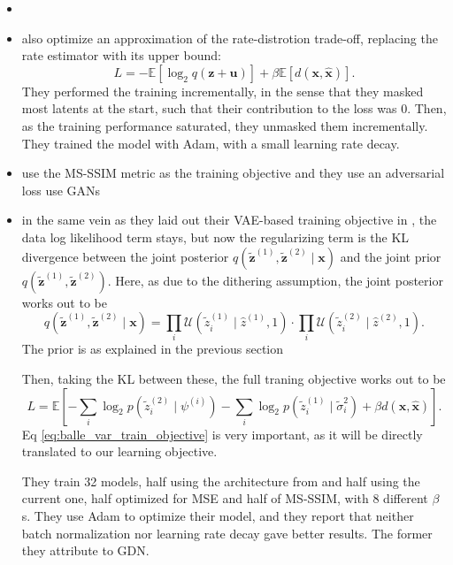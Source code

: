 \documentclass{article}
\renewcommand{\vec}[1]{\mathbf{#1}}
\newcommand{\Exp}{\mathbb{E}}
\newcommand{\Unif}{\mathcal{U}}
\begin{document}
\begin{itemize}
\item \cite{toderici2017full}
\item \cite{theis2017lossy}
  also optimize an approximation of the rate-distrotion trade-off, replacing the
  rate estimator with its upper bound:
  \[
    L = -\Exp[\log_2 q(\vec{z} + \vec{u})] + \beta \Exp[d(\vec{x}, \vec{\hat{x}})].
  \]
  They performed the training incrementally, in the sense that they masked most
  latents at the start, such that their contribution to the loss was 0. Then, as
  the training performance saturated, they unmasked them incrementally.
  They trained the model with Adam, with a small learning rate decay.
\item \cite{rippel2017real} use the MS-SSIM metric as the training objective and
  they use an adversarial \cite{goodfellow2014generative} loss use GANs 
\item \cite{balle2018variational} in the same vein as they laid out their
  VAE-based training objective in \cite{balle2016end}, the data log likelihood
  term stays, but now the regularizing term is the KL divergence between the
  joint posterior $q(\vec{\tilde{z}}^{(1)}, \vec{\tilde{z}}^{(2)} \mid \vec{x})$
  and the joint prior 
  $q(\vec{\tilde{z}}^{(1)}, \vec{\tilde{z}}^{(2)})$. Here, as due to the
  dithering assumption, the joint posterior works out to be
  \[
    q\left(\vec{\tilde{z}}^{(1)}, \vec{\tilde{z}}^{(2)} \mid \vec{x}\right) =
    \prod_i \Unif\left(\tilde{z}^{(1)}_i \mid \hat{z}^{(1)}, 1\right) \cdot
    \prod_i \Unif\left(\tilde{z}^{(2)}_i \mid \hat{z}^{(2)}, 1\right).
  \]
  The prior is as explained in the previous section
  \par
  Then, taking the KL between these, the full traning objective works out to be
  \begin{equation}
    \label{eq:balle_var_train_objective}
    L = \Exp\left[ -\sum_i \log_2 p(\tilde{z}^{(2)}_i \mid \psi^{(i)}) 
      -\sum_i \log_2 p(\tilde{z}^{(1)}_i \mid \tilde{\sigma}^2_i) +
      \beta d(\vec{x}, \vec{\hat{x}})\right].
  \end{equation}
  Eq \ref{eq:balle_var_train_objective} is very important, as it will be
  directly translated to our learning objective.
  \par
  They train 32 models, half using the architecture from \cite{balle2016end} and
  half using the current one, half optimized for MSE and half of MS-SSIM, with 8
  different $\beta$s. They use Adam to optimize their model, and they report
  that neither batch normalization nor learning rate decay gave better results.
  The former they attribute to GDN.
\end{itemize}
\end{document}
